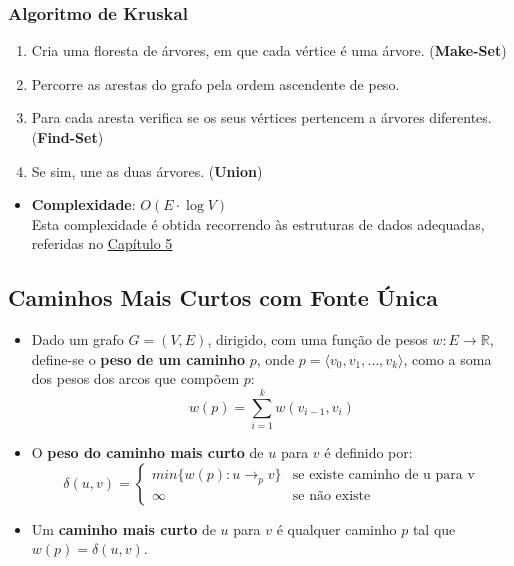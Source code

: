 \documentclass[11pt]{article}
\newcommand{\twopartdef}[4]
{ \displaystyle
	\left\{
		\begin{array}{ll}
			#1 & \mbox{se } #2 \\
			#3 & \mbox{se } #4
		\end{array}
	\right.
}
\begin{document}
\subsubsection{Algoritmo de Kruskal}

\begin{enumerate}
    \item Cria uma floresta de árvores, em que cada vértice é uma árvore. (\textbf{Make-Set})
    \item Percorre as arestas do grafo pela ordem ascendente de peso.
    \item Para cada aresta verifica se os seus vértices pertencem a árvores diferentes. (\textbf{Find-Set})
    \item Se sim, une as duas árvores. (\textbf{Union})
\end{enumerate}
\begin{itemize}[topsep=0pt]
    \item \textbf{Complexidade}: $O(E \cdot \log V)$ \\[8pt]
          Esta complexidade é obtida recorrendo às estruturas de dados adequadas, referidas no \hyperlink{section.5}{\underline{Capítulo 5}}
\end{itemize}

\newpage

\subsection{Caminhos Mais Curtos com Fonte Única} 

\begin{itemize}
    \item Dado um grafo $G = (V,E)$, dirigido, com uma função de pesos $w : E \rightarrow \mathbb{R}$, define-se o \textbf{peso de um caminho} $p$, onde $p=\langle v_0,v_1, \ldots,v_k \rangle $, como a soma dos pesos dos arcos que compõem $p$:
          \begin{equation*}
              w(p) = \sum_{i=1}^{k} w(v_{i-1},v_i)
          \end{equation*}
    \item O \textbf{peso do caminho mais curto} de $u$ para $v$ é definido por:
          \begin{equation*}
              \delta(u,v) = \twopartdef{min\{w(p): u \rightarrow_p v\}}
              {\text{existe caminho de u para v}}
              {\infty}{\text{não existe}}
          \end{equation*}
    \item Um \textbf{caminho mais curto} de $u$ para $v$ é qualquer caminho $p$ tal que $w(p) = \delta(u,v)$.
\end{itemize}
\end{document}
